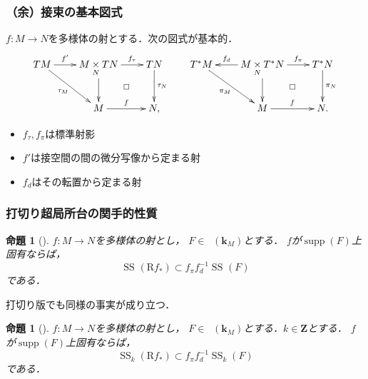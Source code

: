 \documentclass[dvipdfmx,10pt,aspectratio=169,leqno]{beamer}%
\newcommand{\zz}{\mathbf{Z}}
\newcommand{\kk}{\mathbf{k}}
\numberwithin{equation}{subsection}
\newcommand{\supp}{\mathop{\mathrm{supp}}\nolimits}
\newcommand{\Dompb}{\mathop{\mathsf{D}^\mathrm{b}}\nolimits}
\newcommand{\muS}[1][]{\mathop{\mathrm{SS}}\nolimits_{#1}}
\newcommand{\Rder}{\mathrm{R}}
\newcommand{\mpb}[1][]{{#1}_{\pi}} %
\newcommand{\mdiff}[1][]{{#1}_{d}} %
\newcommand{\mptan}[1][]{{#1}_{\tau}} %
\newcommand{\cotb}[1][]{T^{\ast}{#1}}
\newcommand{\pb}[1][]{\mathbin{\mathop{\times}\limits_{#1}}}
\theoremstyle{mystyle}
\newtheorem{PRP}[AXM]{命題}
\begin{document}
\begin{frame}\frametitle{（余）接束の基本図式}
    \(f\colon M\to N\)を多様体の射とする．次の図式が基本的．
    \[\vcenter{\xymatrix@C=22pt@R=26pt{
        TM
        \ar[rd]_-{\tau_M}
        \ar[r]^-{f'}
        &
        M\pb[N] TN
        \ar[d]_-{}
        \ar[r]^-{\mptan[f]}
        \ar@{}[dr]|\square
        &
        TN
        \ar[d]^-{\tau_N}
        &
        \cotb[M]
        \ar[rd]_-{\pi_M}
        &
        M\pb[N] \cotb[N]
        \ar[d]_-{}
        \ar[r]^-{\mpb[f]}
        \ar[l]_-{\mdiff[f]}
        \ar@{}[dr]|\square
        &
        \cotb[N]
        \ar[d]^-{\pi_N}
        \\
        &
        M
        \ar[r]^-{f}
        &
        N,
        &
        &
        M
        \ar[r]^-{f}
        &
        N.
    }}\]
    \begin{itemize}
        \item \(\mptan[f], \mpb[f]\)は標準射影
        \item \(f'\)は接空間の間の微分写像から定まる射
        \item \(\mdiff[f]\)はその転置から定まる射
    \end{itemize}
\end{frame}
\begin{frame}
    \frametitle{打切り超局所台の関手的性質}
    \begin{PRP}[{\cite[Proposition 5.4.4]{KS90}}]\label{prp:img}
        \(f\colon M\to N\)を多様体の射とし，
        \(F\in\Dompb(\kk_M)\)とする．
        \(f\)が\(\supp(F)\)上固有ならば，
        \[
            \muS[](\Rder{f_{\ast}})
            \subset
            \mpb[f]\mdiff[f]^{-1}\muS[](F)
        \]である．
    \end{PRP}
    打切り版でも同様の事実が成り立つ．
    \begin{PRP}[{\cite[Proposition 4.3]{KFS03a}}]\label{prp:t-img}
        \(f\colon M\to N\)を多様体の射とし，
        \(F\in\Dompb(\kk_M)\)とする．\(k\in\zz\)とする．
        \(f\)が\(\supp(F)\)上固有ならば，
        \[
            \muS[k](\Rder{f_{\ast}})
            \subset
            \mpb[f]\mdiff[f]^{-1}\muS[k](F)
        \]である．
    \end{PRP}
\end{frame}
\end{document}
